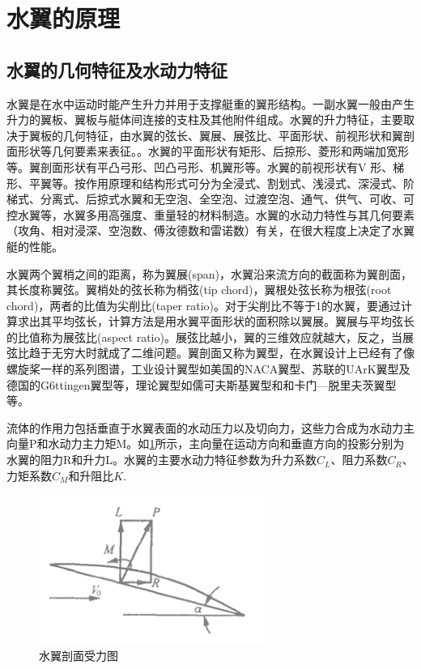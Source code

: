 \documentclass[10.5pt,twocolumn]{jbuaa}
\begin{document}
\section{水翼的原理}
%
%
%

\subsection{水翼的几何特征及水动力特征}
水翼是在水中运动时能产生升力并用于支撑艇重的翼形结构。一副水翼一般由产生升力的翼板、翼板与艇体间连接的支柱及其他附件组成。水翼的升力特征，主要取决于翼板的几何特征，由水翼的弦长、翼展、展弦比、平面形状、前视形状和翼剖面形状等几何要素来表征。。水翼的平面形状有矩形、后掠形、菱形和两端加宽形等。翼剖面形状有平凸弓形、凹凸弓形、机翼形等。水翼的前视形状有V 形、梯形、平翼等。按作用原理和结构形式可分为全浸式、割划式、浅浸式、深浸式、阶梯式、分离式、后掠式水翼和无空泡、全空泡、过渡空泡、通气、供气、可收、可控水翼等，水翼多用高强度、重量轻的材料制造。水翼的水动力特性与其几何要素（攻角、相对浸深、空泡数、傅汝德数和雷诺数）有关，在很大程度上决定了水翼艇的性能。

水翼两个翼梢之间的距离，称为翼展(span)，水翼沿来流方向的截面称为翼剖面，其长度称翼弦。翼梢处的弦长称为梢弦(tip chord)，翼根处弦长称为根弦(root chord)，两者的比值为尖削比(taper ratio)。对于尖削比不等于1的水翼，要通过计算求出其平均弦长，计算方法是用水翼平面形状的面积除以翼展。翼展与平均弦长的比值称为展弦比(aspect ratio)。展弦比越小，翼的三维效应就越大，反之，当展弦比趋于无穷大时就成了二维问题。翼剖面又称为翼型，在水翼设计上已经有了像螺旋桨一样的系列图谱，工业设计翼型如美国的NACA翼型、苏联的UArK翼型及德国的G6ttingen翼型等，理论翼型如儒可夫斯基翼型和和卡门—脱里夫茨翼型等。

流体的作用力包括垂直于水翼表面的水动压力以及切向力，这些力合成为水动力主向量P和水动力主力矩M。如\ref{fig:force}所示，主向量在运动方向和垂直方向的投影分别为水翼的阻力R和升力L。水翼的主要水动力特征参数为升力系数$C_L$、阻力系数$C_R$、力矩系数$C_M$和升阻比$K$.
\begin{figure}
	\centering
	\includegraphics[scale=1,trim=0 0 0 0]{image/force}
	\caption{水翼剖面受力图}
	\label{fig:force}
\end{figure}
\end{document}
